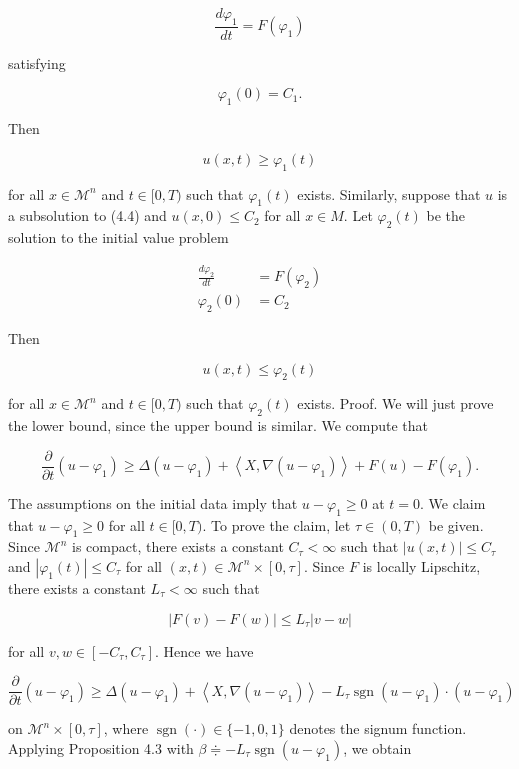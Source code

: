 \documentclass[10pt, letterpaper]{article}
\begin{document}
$$
\frac{d \varphi_1}{d t}=F\left(\varphi_1\right)
$$

satisfying

$$
\varphi_1(0)=C_1 .
$$


Then

$$
u(x, t) \geq \varphi_1(t)
$$

for all $x \in \mathcal{M}^n$ and $t \in[0, T)$ such that $\varphi_1(t)$ exists.
Similarly, suppose that $u$ is a subsolution to (4.4) and $u(x, 0) \leq C_2$ for all $x \in M$. Let $\varphi_2(t)$ be the solution to the initial value problem

$$
\begin{aligned}
\frac{d \varphi_2}{d t} & =F\left(\varphi_2\right) \\
\varphi_2(0) & =C_2
\end{aligned}
$$


Then

$$
u(x, t) \leq \varphi_2(t)
$$

for all $x \in \mathcal{M}^n$ and $t \in[0, T)$ such that $\varphi_2(t)$ exists.
Proof. We will just prove the lower bound, since the upper bound is similar. We compute that

$$
\frac{\partial}{\partial t}\left(u-\varphi_1\right) \geq \Delta\left(u-\varphi_1\right)+\left\langle X, \nabla\left(u-\varphi_1\right)\right\rangle+F(u)-F\left(\varphi_1\right) .
$$

The assumptions on the initial data imply that $u-\varphi_1 \geq 0$ at $t=0$. We claim that $u-\varphi_1 \geq 0$ for all $t \in[0, T)$. To prove the claim, let $\tau \in(0, T)$ be given. Since $\mathcal{M}^n$ is compact, there exists a constant $C_\tau<\infty$ such that $|u(x, t)| \leq C_\tau$ and $\left|\varphi_1(t)\right| \leq C_\tau$ for all $(x, t) \in \mathcal{M}^n \times[0, \tau]$. Since $F$ is locally Lipschitz, there exists a constant $L_\tau<\infty$ such that

$$
|F(v)-F(w)| \leq L_\tau|v-w|
$$

for all $v, w \in\left[-C_\tau, C_\tau\right]$. Hence we have

$$
\frac{\partial}{\partial t}\left(u-\varphi_1\right) \geq \Delta\left(u-\varphi_1\right)+\left\langle X, \nabla\left(u-\varphi_1\right)\right\rangle-L_\tau \operatorname{sgn}\left(u-\varphi_1\right) \cdot\left(u-\varphi_1\right)
$$

on $\mathcal{M}^n \times[0, \tau]$, where $\operatorname{sgn}(\cdot) \in\{-1,0,1\}$ denotes the signum function. Applying Proposition 4.3 with $\beta \doteqdot-L_\tau \operatorname{sgn}\left(u-\varphi_1\right)$, we obtain
\end{document}
